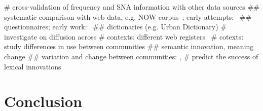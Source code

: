 \documentclass[
  a4paper,
  abstract=on,
  captions=tableabove
  ]{scrartcl}
\begin{document}
    \begin{qitem}
      # cross-validation of frequency and SNA information with other data sources
        ## systematic comparison with web data, e.g. NOW corpus~\parencite{Davies2013CorpusNews}; early attempts:~\cite{Wurschinger2016UsingWeb}
        ## questionnaires; early work:~\cite{Kerremans2015WebNew}
        ## dictionaries (e.g. Urban Dictionary)
      # investigate on diffusion across
        # contexts: different web registers~\parencite{Biber2016RegisterVariation}
        # cotexts: study differences in use between communities
          ## semantic innovation, meaning change
          ## variation and change between communities: \cite{Tredici2019YouShall}, \cite{Schmid2020BattlingSemantica}
      # predict the success of lexical innovations
    \end{qitem}

\section{Conclusion}
  \label{sec:conclusion}


  \printbibliography


\end{document}
